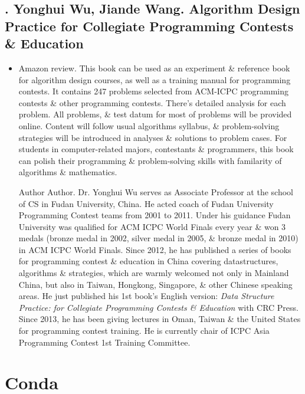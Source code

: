 \documentclass{article}
\begin{document}

\subsection{\cite{Wu_Wang2018}. {\sc Yonghui Wu, Jiande Wang}. Algorithm Design Practice for Collegiate Programming Contests \& Education}

\begin{itemize}
	\item {\sf Amazon review.} This book can be used as an experiment \& reference book for algorithm design courses, as well as a training manual for programming contests. It contains 247 problems selected from ACM-ICPC programming contests \& other programming contests. There's detailed analysis for each problem. All problems, \& test datum for most of problems will be provided online. Content will follow usual algorithms syllabus, \& problem-solving strategies will be introduced in analyses \& solutions to problem cases. For students in computer-related majors, contestants \& programmers, this book can polish their programming \& problem-solving skills with familarity of algorithms \& mathematics.
	
	{\sf Author Author.} Dr. {\sc Yonghui Wu} serves as Associate Professor at the school of CS in Fudan University, China. He acted coach of Fudan University Programming Contest teams from 2001 to 2011. Under his guidance Fudan University was qualified for ACM ICPC World Finals every year \& won 3 medals (bronze medal in 2002, silver medal in 2005, \& bronze medal in 2010) in ACM ICPC World Finals. Since 2012, he has published a series of books for programming contest \& education in China covering datastructures, algorithms \& strategies, which are warmly welcomed not only in Mainland China, but also in Taiwan, Hongkong, Singapore, \& other Chinese speaking areas. He just published his 1st book's English version: {\it Data Structure Practice: for Collegiate Programming Contests \& Education} with CRC Press. Since 2013, he has been giving lectures in Oman, Taiwan \& the United States for programming contest training. He is currently chair of ICPC Asia Programming Contest 1st Training Committee.
\end{itemize}


\section{Conda}
\end{document}

